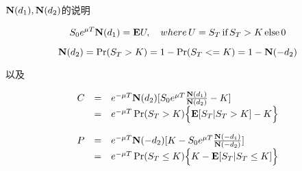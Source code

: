 $\mathbf{N}(d_1), \mathbf{N}(d_2)$的说明

\begin{equation}
    S_0e^{\mu T}\mathbf{N}(d_1) = \mathbf{E} U,\quad where\, U = S_T\, \text{if} \, S_T > K \, \text{else} \, 0
\end{equation}

\begin{equation}
    \mathbf{N}(d_2) = \Pr(S_T > K) = 1 - \Pr(S_T <= K) = 1 - \mathbf{N}(-d_2)
\end{equation}

以及

\begin{equation}
    \begin{array}{rcl}
        C & = & e^{-\mu T}\mathbf{N}(d_2)[S_0e^{\mu T}\frac{\mathbf{N}(d_1)}{\mathbf{N}(d_2)} - K] \\
          & = & e^{-\mu T}\Pr(S_T > K)\Big\{\mathbf{E}[S_T|S_T > K] - K\Big\}
    \end{array}
\end{equation}

\begin{equation}
    \begin{array}{rcl}
        P & = & e^{-\mu T}\mathbf{N}(-d_2)[K - S_0e^{\mu T}\frac{\mathbf{N}(-d_1)}{\mathbf{N}(-d_2)}] \\
        & = & e^{-\mu T}\Pr(S_T \leq K)\Big\{K - \mathbf{E}[S_T|S_T \leq K]\Big\}
    \end{array}
\end{equation}